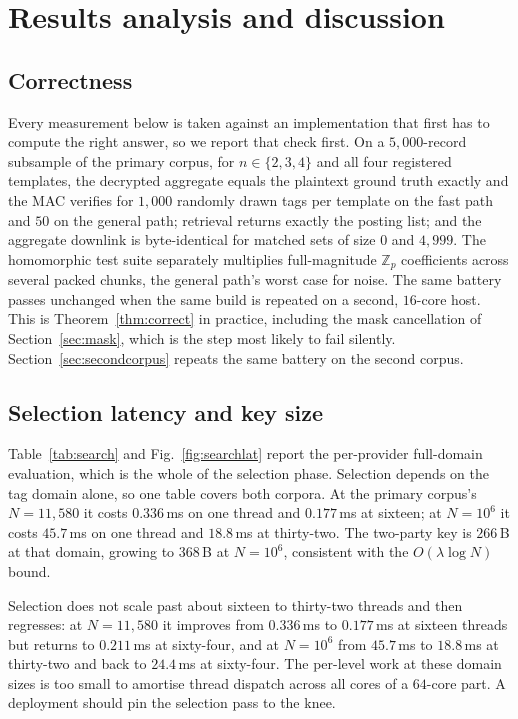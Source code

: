 \documentclass[a4paper,fleqn]{cas-dc}
\begin{document}
\section{Results analysis and discussion}
\label{sec:resultsdisc}

\subsection{Correctness}
\label{sec:correctness}
Every measurement below is taken against an implementation that first has to
compute the right answer, so we report that check first. On a
$5{,}000$-record subsample of the primary corpus, for $n\in\{2,3,4\}$ and all
four registered templates, the decrypted aggregate equals the plaintext ground
truth exactly and the MAC verifies for $1{,}000$ randomly drawn tags per
template on the fast path and $50$ on the general path; retrieval returns
exactly the posting list; and the aggregate downlink is byte-identical for
matched sets of size $0$ and $4{,}999$. The homomorphic test suite separately
multiplies full-magnitude $\mathbb{Z}_p$ coefficients across several packed
chunks, the general path's worst case for noise. The same battery passes
unchanged when the same build is repeated on a second, $16$-core host. This is Theorem~\ref{thm:correct} in practice, including the mask
cancellation of Section~\ref{sec:mask}, which is the step most likely to fail
silently. Section~\ref{sec:secondcorpus} repeats the same battery on the
second corpus.

\subsection{Selection latency and key size}
Table~\ref{tab:search} and Fig.~\ref{fig:searchlat} report the per-provider
full-domain evaluation, which is the whole of the selection phase. Selection
depends on the tag domain alone, so one table covers both corpora. At the
primary corpus's $N=11{,}580$ it costs $0.336$\,ms on one thread and
$0.177$\,ms at sixteen; at $N=10^6$ it costs $45.7$\,ms on one thread and
$18.8$\,ms at thirty-two. The two-party key is $266$\,B at that domain,
growing to $368$\,B at $N=10^6$, consistent with the $O(\lambda\log N)$ bound.

Selection does not scale past about sixteen to thirty-two threads and then
regresses: at $N=11{,}580$ it improves from $0.336$\,ms to $0.177$\,ms at
sixteen threads but returns to $0.211$\,ms at sixty-four, and at $N=10^6$ from
$45.7$\,ms to $18.8$\,ms at thirty-two and back to $24.4$\,ms at sixty-four.
The per-level work at these domain sizes is too small to amortise thread
dispatch across all cores of a $64$-core part. A deployment should pin the
selection pass to the knee.
\end{document}
